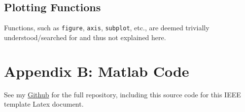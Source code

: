 \documentclass[journal]{IEEEtran}
\def\code#1{\texttt{#1}}
\begin{document}
\subsection{Plotting Functions}
Functions, such as \code{figure}, \code{axis}, \code{subplot}, etc., are deemed trivially understood/searched for and thus not explained here.

\newpage
\clearpage
\newpage
\section{Appendix B: Matlab Code}
See my \href{https://github.com/eric-silk/AMATH582_HW1}{Github} for the full repository, including this source code for this IEEE template Latex document.
\end{document}
